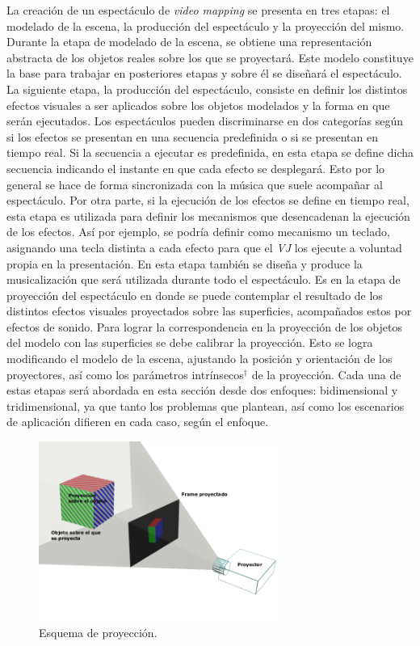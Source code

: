 La creación de un espectáculo de \emph{video mapping} se presenta en tres etapas: el modelado de la escena, la producción del espectáculo y la proyección del mismo.
Durante la etapa de modelado de la escena, se obtiene una representación abstracta de los objetos reales sobre los que se proyectará. Este modelo constituye la base para trabajar en posteriores etapas y sobre él se diseñará el espectáculo.
La siguiente etapa, la producción del espectáculo, consiste en definir los distintos efectos visuales a ser aplicados sobre los objetos modelados y la forma en que serán ejecutados. Los espectáculos pueden discriminarse en dos categorías según si los efectos se presentan en una secuencia predefinida o si se presentan en tiempo real.
Si la secuencia a ejecutar es predefinida, en esta etapa se define dicha secuencia indicando el instante en que cada efecto se desplegará. Esto por lo general se hace de forma sincronizada con la música que suele acompañar al espectáculo. Por otra parte, si la ejecución de los efectos se define en tiempo real, esta etapa es utilizada para definir los mecanismos que desencadenan la ejecución de los efectos. Así por ejemplo, se podría definir como mecanismo un teclado, asignando una tecla distinta a cada efecto para que el \emph{VJ} los ejecute a voluntad propia en la presentación.
En esta etapa también se diseña y produce la musicalización que será utilizada durante todo el espectáculo.
Es en la etapa de proyección del espectáculo en donde se puede contemplar el resultado de los distintos efectos visuales proyectados sobre las superficies, acompañados estos por efectos de sonido.
Para lograr la correspondencia en la proyección de los objetos del modelo con las superficies se debe calibrar la proyección.
Esto se logra modificando el modelo de la escena, ajustando la posición y orientación de los proyectores, así como los parámetros intrínsecos$^\dagger$ de la proyección.
Cada una de estas etapas será abordada en esta sección desde dos enfoques: bidimensional y tridimensional, ya que tanto los problemas que plantean, así como los escenarios de aplicación difieren en cada caso, según el enfoque.

\begin{figure}[H]
  \centering
    \includegraphics[width=0.7\textwidth]{./Cap2_videomapping/proy2dvs3d}
  \caption[Imagen propia]{Esquema de proyección.}
  \label{fig:proy2dvs3d}
\end{figure}

